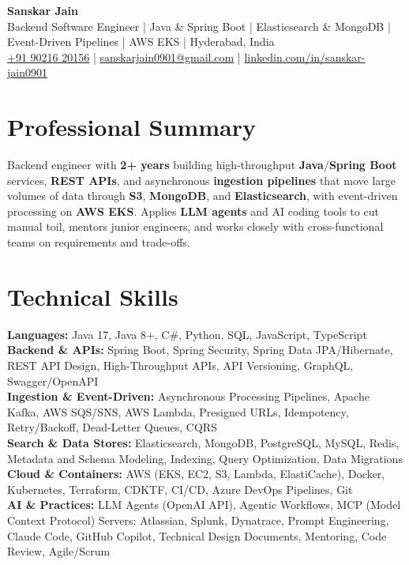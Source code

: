 \documentclass[a4paper,10pt]{article}
\begin{document}
\begin{center}
    {\LARGE \textbf{Sanskar Jain}} \\
    \vspace{2pt}
    Backend Software Engineer \;|\; Java \& Spring Boot \;|\; Elasticsearch \& MongoDB \;|\; Event-Driven Pipelines \;|\; AWS EKS \;|\; Hyderabad, India \\
    \vspace{2pt}
    \href{tel:+919021620156}{+91 90216 20156} \;|\;
    \href{mailto:sanskarjain0901@gmail.com}{sanskarjain0901@gmail.com} \;|\;
    \href{https://www.linkedin.com/in/sanskar-jain0901/}{linkedin.com/in/sanskar-jain0901}
\end{center}

\section*{Professional Summary}
Backend engineer with \textbf{2+ years} building high-throughput \textbf{Java}/\textbf{Spring Boot} services, \textbf{REST APIs}, and asynchronous \textbf{ingestion pipelines} that move large volumes of data through \textbf{S3}, \textbf{MongoDB}, and \textbf{Elasticsearch}, with event-driven processing on \textbf{AWS EKS}.
Applies \textbf{LLM agents} and AI coding tools to cut manual toil, mentors junior engineers, and works closely with cross-functional teams on requirements and trade-offs.

\section*{Technical Skills}
\begin{sloppypar}
\noindent
\textbf{Languages:} Java 17, Java 8+, C\#, Python, SQL, JavaScript, TypeScript \\
\textbf{Backend \& APIs:} Spring Boot, Spring Security, Spring Data JPA/Hibernate, REST API Design, High-Throughput APIs, API Versioning, GraphQL, Swagger/OpenAPI \\
\textbf{Ingestion \& Event-Driven:} Asynchronous Processing Pipelines, Apache Kafka, AWS SQS/SNS, AWS Lambda, Presigned URLs, Idempotency, Retry/Backoff, Dead-Letter Queues, CQRS \\
\textbf{Search \& Data Stores:} Elasticsearch, MongoDB, PostgreSQL, MySQL, Redis, Metadata and Schema Modeling, Indexing, Query Optimization, Data Migrations \\
\textbf{Cloud \& Containers:} AWS (EKS, EC2, S3, Lambda, ElastiCache), Docker, Kubernetes, Terraform, CDKTF, CI/CD, Azure DevOps Pipelines, Git \\
\textbf{AI \& Practices:} LLM Agents (OpenAI API), Agentic Workflows, MCP (Model Context Protocol) Servers: Atlassian, Splunk, Dynatrace, Prompt Engineering, Claude Code, GitHub Copilot, Technical Design Documents, Mentoring, Code Review, Agile/Scrum
\end{sloppypar}
\end{document}
